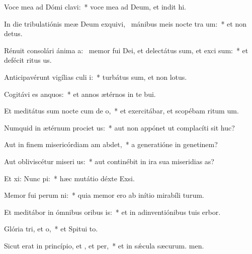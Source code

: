 \item Voce mea ad Dómi clavi:~* voce mea ad Deum, et indit hi.
\item In die tribulatiónis meæ Deum exquivi,~\pscross{} mánibus meis nocte tra um:~* et non  detus.
\item Rénuit consolári ánima a:~\pscross{} memor fui Dei, et delectátus sum, et exci sum:~* et defécit ritus us.
\item Anticipavérunt vigílias culi i:~* turbátus sum, et non  lotus.
\item Cogitávi es anquos:~* et annos ætérnos in te bui.
\item Et meditátus sum nocte cum de o,~* et exercitábar, et scopébam ritum um.
\item Numquid in ætérnum prociet us:~* aut non appónet ut complacíti sit huc?
\item Aut in finem misericórdiam am abdet,~* a generatióne in genetinem?
\item Aut obliviscétur miseri us:~* aut continébit in ira sua miseridias as?
\item Et xi: Nunc pi:~* hæc mutátio déxte Exsi.
\item Memor fui perum ni:~* quia memor ero ab inítio mirabíli turum.
\item Et meditábor in ómnibus oribus is:~* et in adinventiónibus tuis erbor.
\item Glória tri, et o,~* et Spitui to.
\item Sicut erat in princípio, et , et per,~* et in sǽcula sæcurum. men.
